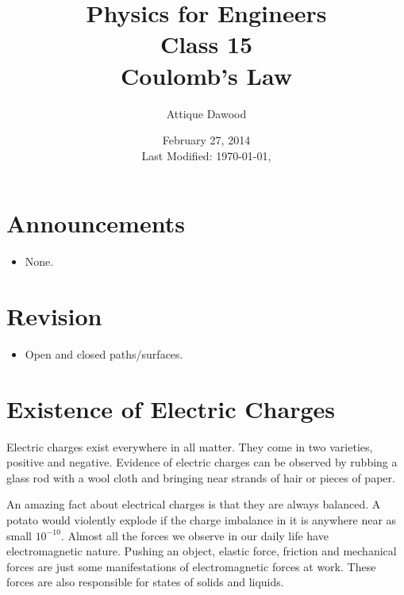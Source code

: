 \documentclass[12pt,a4paper]{article}
\title{\vspace{-2cm}Physics for Engineers\\Class 15\\Coulomb's Law}
\author{Attique Dawood}
\date{February 27, 2014\\[0.2cm] Last Modified: \today, \currenttime}
\begin{document}
\maketitle
\section{Announcements}
\begin{itemize}
\item None.
\end{itemize}
\section{Revision}
\begin{itemize}
\item Open and closed paths/surfaces.
\end{itemize}
\section{Existence of Electric Charges}
Electric charges exist everywhere in all matter. They come in two varieties, positive and negative. Evidence of electric charges can be observed by rubbing a glass rod with a wool cloth and bringing near strands of hair or pieces of paper.

An amazing fact about electrical charges is that they are always balanced. A potato would violently explode if the charge imbalance in it is anywhere near as small $10^{-10}$. Almost all the forces we observe in our daily life have electromagnetic nature. Pushing an object, elastic force, friction and mechanical forces are just some manifestations of electromagnetic forces at work. These forces are also responsible for states of solids and liquids.
\end{document}
